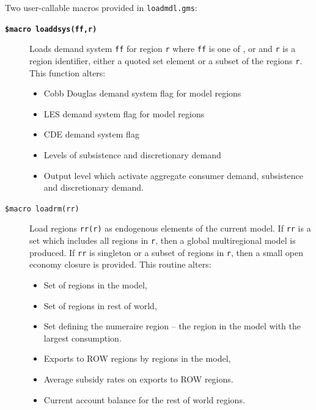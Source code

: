Two user-callable macros provided in \texttt{loadmdl.gms}:\begin{description}

\item[\textbf{\texttt{\$macro loaddsys(ff,r)}}] Loads demand system
\texttt{ff} for region \texttt{r} where \texttt{ff} is one of \LES,
\CD or \CDE and \texttt{r} is a region identifier, either a quoted set
element or a subset of the regions \texttt{r}.  This function alters:
\begin{itemize}
\item[\texttt{cd(r)}]  Cobb Douglas demand system flag for model regions
\item[\texttt{les(r)}]  LES demand system flag for model regions
\item[\texttt{cde(r)}] CDE demand system flag
\item[ \texttt{vdfm(),vifm()}] Levels of subsistence and discretionary demand
\item[ \texttt{vom()}] Output level which activate aggregate consumer demand, subsistence and discretionary demand.
\end{itemize}

\item[\texttt{\$macro loadrm(rr)}] Load regions \texttt{rr(r)} as
endogenous elements of the current model.  If \texttt{rr} is a set
which includes all regions in \texttt{r}, then a global multiregional
model is produced.  If \texttt{rr} is singleton or a subset of regions
in \texttt{r}, then a small open economy closure is provided.  This
routine alters: \begin{itemize}

\item[\texttt{rm(r)}]   Set of regions in the model,
\item[\texttt{rx(r)}]   Set of regions in rest of world,
\item[\texttt{rnum(r)}] Set defining the numeraire region -- the region in the model with the largest consumption.
\item[\texttt{vem(i,r)}]        Exports to ROW regions by regions in the model,
\item[\texttt{rtxs\_row(i,r)}]  Average subsidy rates on exports to ROW regions.
\item[\texttt{rowpfx}]          Current account balance for the rest of world regions.
\end{itemize}
\end{description}

\newpage

